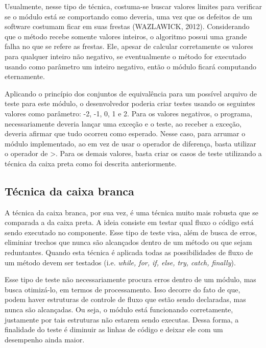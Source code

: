 \documentclass[
    12pt,       %
    openright,      %
    twoside,      %
    a4paper,      %
    english,      %
    french,       %
    spanish,      %
    brazil,       %
    ]{abntex2}
\begin{document}
              Usualmente, nesse tipo de técnica, costuma-se buscar valores limites para verificar
              se o módulo está se comportando como deveria, uma vez que os defeitos de um software
              costumam ficar em suas frestas (WAZLAWICK, 2012). Considerando que o método recebe somente
              valores inteiros, o algoritmo possui uma grande falha no que se refere as frestas. Ele,
              apesar de calcular corretamente os valores para qualquer inteiro não negativo, se
              eventualmente o método for executado usando como parâmetro um inteiro negativo, então o
              módulo ficará computando eternamente.

              Aplicando o princípio dos conjuntos de equivalência para um possível arquivo de teste
              para este módulo, o desenvolvedor poderia criar testes usando os seguintes valores como
              parâmetro: -2, -1, 0, 1 e 2. Para os valores negativos, o programa, necessariamente deveria
              lançar uma exceção e o teste, ao receber a exceção, deveria afirmar que tudo ocorreu como
              esperado. Nesse caso, para arrumar o módulo implementado, ao em vez de usar o
              operador de diferença, basta utilizar o operador de >. Para os demais valores, basta criar
              os casos de teste utilizando a técnica da caixa preta como foi descrita anteriormente.

          \subsection{Técnica da caixa branca}
              A técnica da caixa branca, por sua vez, é uma técnica muito mais robusta que se comparada
              a da caixa preta. A ideia consiste em testar qual fluxo o código está sendo executado no
              componente. Esse tipo de teste visa, além de busca de erros, eliminiar trechos que nunca
              são alcançados dentro de um método ou que sejam reduntantes. Quando esta técnica é
              aplicada todas as possibilidades de fluxo de um método devem ser testados
              (i.e. \textit{while, for, if, else, try, catch, finally}).

              Esse tipo de teste não necessariamente procura erros dentro de um módulo, mas busca
              otimizá-lo, em termos de processamento. Isso decorre do fato de que, podem haver
              estruturas de controle de fluxo que estão sendo declaradas, mas nunca são alcançadas.
              Ou seja, o módulo está funcionando corretamente, justamente por tais estruturas não
              estarem sendo executas. Dessa forma, a finalidade do teste é diminuir as linhas de código
              e deixar ele com um desempenho ainda maior.
\end{document}
